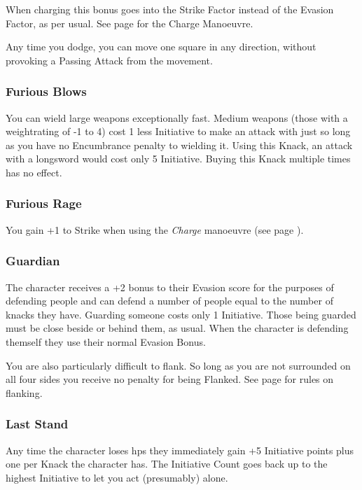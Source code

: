 \begin{multicols}{2}
When charging this bonus goes into the Strike Factor instead of the Evasion Factor, as per usual.
See page \pageref{charge} for the Charge Manoeuvre.

Any time you dodge, you can move one square in any direction, without provoking a Passing Attack from the movement.

\subsubsection{Furious Blows}\label{furiousblows}

You can wield large weapons exceptionally fast.
Medium weapons (those with a \gls{weightrating} of -1 to 4) cost 1 less Initiative to make an attack with just so long as you have no Encumbrance penalty to wielding it.
Using this Knack, an attack with a longsword would cost only 5 Initiative.
Buying this Knack multiple times has no effect.

\subsubsection{Furious Rage}

You gain +1 to Strike when using the \textit{Charge} manoeuvre (see page \pageref{charge}).

\subsubsection{Guardian}

The character receives a +2 bonus to their Evasion score for the purposes of defending people and can defend a number of people equal to the number of knacks they have.
Guarding someone costs only 1 Initiative.
Those being guarded must be close beside or behind them, as usual.
When the character is defending themself they use their normal Evasion Bonus.

You are also particularly difficult to flank.
So long as you are not surrounded on all four sides you receive no penalty for being Flanked.
See page \pageref{flank} for rules on flanking.

\subsubsection{Last Stand}

Any time the character loses \glspl{hp} they immediately gain +5 Initiative points plus one per Knack the character has.
The Initiative Count goes back up to the highest Initiative to let you act (presumably) alone.


\end{multicols}
